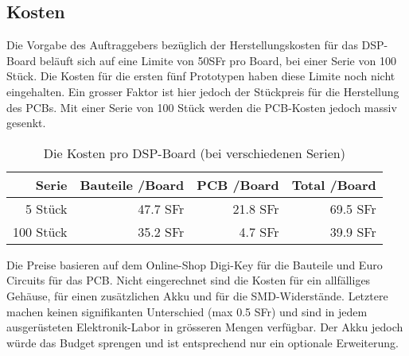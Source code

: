 \subsection{Kosten}
\label{sec:Kosten}

Die Vorgabe des Auftraggebers bezüglich der Herstellungskosten für das DSP-Board beläuft sich auf eine Limite von 50SFr pro Board, bei einer Serie von 100 Stück. Die Kosten für die ersten fünf Prototypen haben diese Limite noch nicht eingehalten. Ein grosser Faktor ist hier jedoch der Stückpreis für die Herstellung des PCBs. Mit einer Serie von 100 Stück werden die PCB-Kosten jedoch massiv gesenkt.

\begin{table}[H]
	\centering
	\begin{tabular}{|r|r|r|r|}
		\hline
		\textbf{Serie} & \textbf{Bauteile /Board}             & \textbf{PCB /Board} & \textbf{Total /Board} \\ \hline
		5 Stück              &           47.7 SFr      & 21.8 SFr & 69.5 SFr    \\ \hline
		100 Stück           & 35.2 SFr                       & 4.7 SFr  & 39.9 SFr    \\ \hline
	\end{tabular}
	\caption{Die Kosten pro DSP-Board (bei verschiedenen Serien)}
	\label{tab:kosten}
\end{table}


Die Preise basieren auf dem Online-Shop Digi-Key \cite{www:digikey} für die Bauteile und Euro Circuits \cite{www:eurocircuits} für das PCB.
Nicht eingerechnet  sind die Kosten für ein allfälliges Gehäuse, für einen zusätzlichen Akku und für die SMD-Widerstände. Letztere machen keinen signifikanten Unterschied (max 0.5 SFr) und sind in jedem ausgerüsteten Elektronik-Labor in grösseren Mengen verfügbar. Der Akku jedoch würde das Budget sprengen und ist entsprechend nur ein optionale Erweiterung.